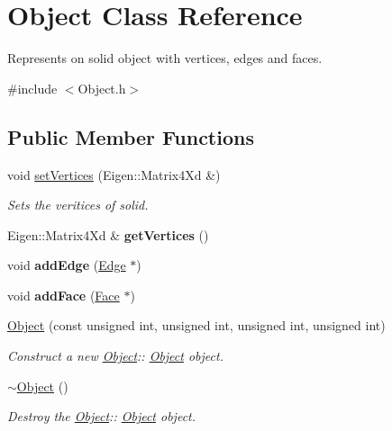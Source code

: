 \hypertarget{classObject}{}\section{Object Class Reference}
\label{classObject}


Represents on solid object with vertices, edges and faces.  




{\ttfamily \#include $<$Object.\+h$>$}

\subsection*{Public Member Functions}
\begin{DoxyCompactItemize}
\item 
void \hyperlink{classObject_a606dc79aaae91cea45c7b4c4a6af973f}{set\+Vertices} (Eigen\+::\+Matrix4\+Xd \&)
\begin{DoxyCompactList}\small\item\em Sets the veritices of solid. \end{DoxyCompactList}\item 
\mbox{\label{classObject_ac6bded42fb5326ef81de129c8c6a9ca7}} 
Eigen\+::\+Matrix4\+Xd \& {\bfseries get\+Vertices} ()
\item 
\mbox{\label{classObject_a92f15222e80786de290523f8fbfda175}} 
void {\bfseries add\+Edge} (\hyperlink{structEdge}{Edge} $\ast$)
\item 
\mbox{\label{classObject_ac4732f37b71495e90e299f36197dad88}} 
void {\bfseries add\+Face} (\hyperlink{structFace}{Face} $\ast$)
\item 
\hyperlink{classObject_aa75a6e58bf6f58476c7c527e753da1b7}{Object} (const unsigned int, unsigned int, unsigned int, unsigned int)
\begin{DoxyCompactList}\small\item\em Construct a new \hyperlink{classObject}{Object}\+:\+: \hyperlink{classObject}{Object} object. \end{DoxyCompactList}\item 
\mbox{\label{classObject_ae8f5483f459e46687bd01e6f9977afd3}} 
\hyperlink{classObject_ae8f5483f459e46687bd01e6f9977afd3}{$\sim$\+Object} ()
\begin{DoxyCompactList}\small\item\em Destroy the \hyperlink{classObject}{Object}\+:\+: \hyperlink{classObject}{Object} object. \end{DoxyCompactList}\end{DoxyCompactItemize}


